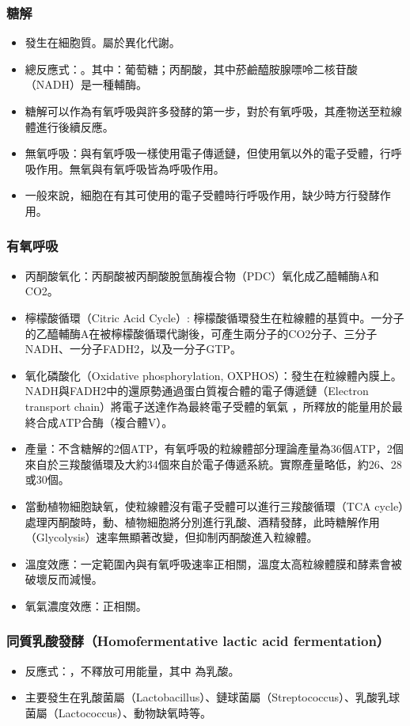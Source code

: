 \documentclass[a4paper,12pt]{report}
\begin{document}
\subsubsection{糖解}
\begin{itemize}
  \item 發生在細胞質。屬於異化代謝。
    \item 總反應式：。其中：葡萄糖；丙酮酸，其中菸鹼醯胺腺嘌呤二核苷酸（NADH）是一種輔酶。
\item 糖解可以作為有氧呼吸與許多發酵的第一步，對於有氧呼吸，其產物送至粒線體進行後續反應。
\item 無氧呼吸：與有氧呼吸一樣使用電子傳遞鏈，但使用氧以外的電子受體，行呼吸作用。無氧與有氧呼吸皆為呼吸作用。
\item 一般來說，細胞在有其可使用的電子受體時行呼吸作用，缺少時方行發酵作用。
\end{itemize}
\subsubsection{有氧呼吸}
  \begin{itemize}
    \item 丙酮酸氧化：丙酮酸被丙酮酸脫氫酶複合物（PDC）氧化成乙醯輔酶A和CO2。
    \item 檸檬酸循環（Citric Acid Cycle）: 檸檬酸循環發生在粒線體的基質中。一分子的乙醯輔酶A在被檸檬酸循環代謝後，可產生兩分子的CO2分子、三分子NADH、一分子FADH2，以及一分子GTP。
    \item 氧化磷酸化（Οxidative phosphorylation, OXPHOS）：發生在粒線體內膜上。NADH與FADH2中的還原勢通過蛋白質複合體的電子傳遞鏈（Electron transport chain）將電子送達作為最終電子受體的氧氣 ，所釋放的能量用於最終合成ATP合酶（複合體V）。
    \item 產量：不含糖解的2個ATP，有氧呼吸的粒線體部分理論產量為36個ATP，2個來自於三羧酸循環及大約34個來自於電子傳遞系統。實際產量略低，約26、28或30個。
    \item 當動植物細胞缺氧，使粒線體沒有電子受體可以進行三羧酸循環（TCA cycle）處理丙酮酸時，動、植物細胞將分別進行乳酸、酒精發酵，此時糖解作用（Glycolysis）速率無顯著改變，但抑制丙酮酸進入粒線體。
    \item 溫度效應：一定範圍內與有氧呼吸速率正相關，溫度太高粒線體膜和酵素會被破壞反而減慢。
    \item 氧氣濃度效應：正相關。
\end{itemize}
\subsubsection{同質乳酸發酵（Homofermentative lactic acid fermentation）}
  \begin{itemize}
    \item 反應式：，不釋放可用能量，其中  為乳酸。
    \item 主要發生在乳酸菌屬（Lactobacillus）、鏈球菌屬（Streptococcus）、乳酸乳球菌屬（Lactococcus）、動物缺氧時等。
\end{itemize}
\end{document}
